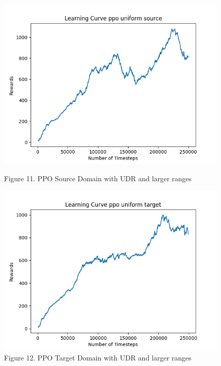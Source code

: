 \documentclass[12pt]{article}
\begin{document}
\begin{figure}[H]
\begin{minipage}{0.45\textwidth}
    \end{minipage}
    \vfill
    \begin{minipage}{0.45\textwidth}
        \centering
        \includegraphics[width=\textwidth]{../images/Learning_Curve_PPO_Uniform_Medium_Source.png}
        \caption{Figure 11. PPO Source Domain with UDR and larger ranges}
        \label{fig:ppo_source_udr_larger}
    \end{minipage}
    \hfill
    \begin{minipage}{0.45\textwidth}
        \centering
        \includegraphics[width=\textwidth]{../images/Learning_Curve_PPO_Uniform_Medium_Target.png}
        \caption{Figure 12. PPO Target Domain with UDR and larger ranges}
        \label{fig:ppo_target_udr_larger}
    \end{minipage}
\end{figure}
\end{document}
